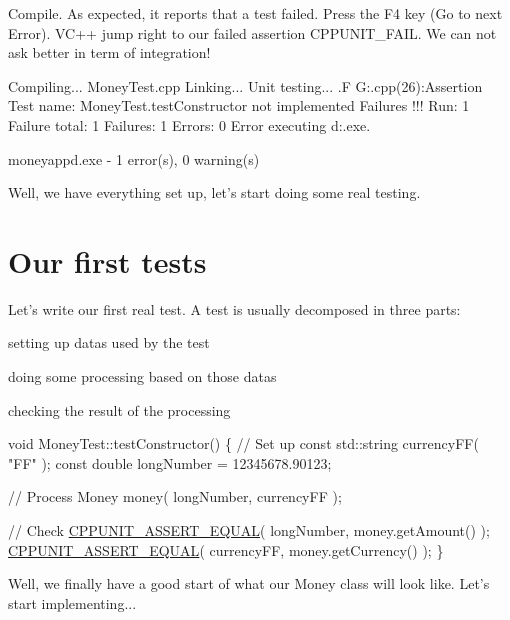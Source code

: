 Compile. As expected, it reports that a test failed. Press the {\ttfamily F4} key (Go to next Error). V\+C++ jump right to our failed assertion C\+P\+P\+U\+N\+I\+T\+\_\+\+F\+A\+I\+L. We can not ask better in term of integration! \begin{DoxyVerb}Compiling...
MoneyTest.cpp
Linking...
Unit testing...
.F
G:\prg\vc\Lib\cppunit\examples\money\MoneyTest.cpp(26):Assertion
Test name: MoneyTest.testConstructor
not implemented
Failures !!!
Run: 1   Failure total: 1   Failures: 1   Errors: 0
Error executing d:\winnt{}\cmd.exe.

moneyappd.exe - 1 error(s), 0 warning(s)
\end{DoxyVerb}


Well, we have everything set up, let's start doing some real testing.\hypertarget{money_example_sec_first_tests}{}\section{Our first tests}\label{money_example_sec_first_tests}
Let's write our first real test. A test is usually decomposed in three parts\+:
\begin{DoxyItemize}
\item setting up datas used by the test
\item doing some processing based on those datas
\item checking the result of the processing
\end{DoxyItemize}


\begin{DoxyCode}
\textcolor{keywordtype}{void} 
MoneyTest::testConstructor()
\{
  \textcolor{comment}{// Set up}
  \textcolor{keyword}{const} std::string currencyFF( \textcolor{stringliteral}{"FF"} );
  \textcolor{keyword}{const} \textcolor{keywordtype}{double} longNumber = 12345678.90123;

  \textcolor{comment}{// Process}
  Money money( longNumber, currencyFF );

  \textcolor{comment}{// Check}
  \hyperlink{group___assertions_ga71162f05be07ef6817d156e77c68b1a3}{CPPUNIT\_ASSERT\_EQUAL}( longNumber, money.getAmount() );
  \hyperlink{group___assertions_ga71162f05be07ef6817d156e77c68b1a3}{CPPUNIT\_ASSERT\_EQUAL}( currencyFF, money.getCurrency() );
\}
\end{DoxyCode}


Well, we finally have a good start of what our Money class will look like. Let's start implementing...

